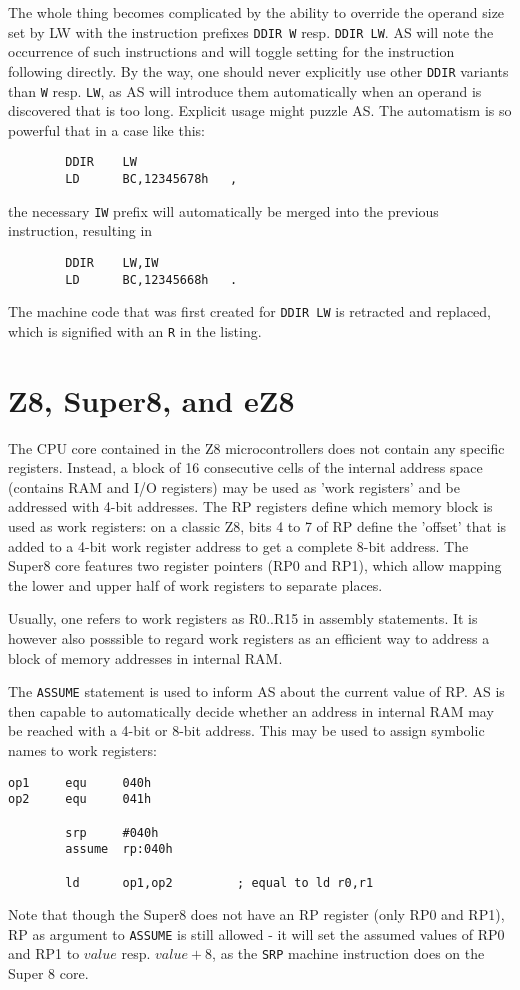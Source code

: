 \documentclass[12pt,twoside]{report}
\newcommand{\tty}[1]{{\tt #1}}
\begin{document}
The whole thing becomes complicated by the ability to override the operand
size set by LW with the instruction prefixes \tty{DDIR W} resp.
\tty{DDIR LW}.  AS will note the occurrence of such instructions and will
toggle setting for the instruction following directly.  By the way, one
should never explicitly use other \tty{DDIR} variants than \tty{W} resp.
\tty{LW}, as AS will introduce them automatically when an operand is
discovered that is too long.  Explicit usage might puzzle AS.  The
automatism is so powerful that in a case like this:
\begin{verbatim}
        DDIR    LW
        LD      BC,12345678h   ,
\end{verbatim}
the necessary \tty{IW} prefix will automatically be merged into the previous
instruction, resulting in
\begin{verbatim}
        DDIR    LW,IW
        LD      BC,12345668h   .
\end{verbatim}
The machine code that was first created for \tty{DDIR LW} is retracted and
replaced, which is signified with an \tty{R} in the listing.


\section{Z8, Super8, and eZ8}
\label{Z8Spec}

The CPU core contained in the Z8 microcontrollers does not
contain any specific registers.  Instead, a block of 16
consecutive cells of the internal address space (contains RAM and
I/O registers) may be used as 'work registers' and be addressed
with 4-bit addresses.  The RP registers define which memory block
is used as work registers: on a classic Z8, bits 4 to 7 of RP
define the 'offset' that is added to a 4-bit work register
address to get a complete 8-bit address.  The Super8 core
features two register pointers (RP0 and RP1), which allow mapping
the lower and upper half of work registers to separate places.

Usually, one refers to work registers as R0..R15 in assembly
statements.  It is however also posssible to regard work registers as
an efficient way to address a block of memory addresses in internal
RAM.

The \tty{ASSUME} statement is used to inform AS about the current
value of RP. AS is then capable to automatically decide whether an
address in internal RAM may be reached with a 4-bit or 8-bit address.
This may be used to assign symbolic names to work registers:
\begin{verbatim}
op1     equ     040h
op2     equ     041h

        srp     #040h
        assume  rp:040h

        ld      op1,op2         ; equal to ld r0,r1
\end{verbatim}
Note that though the Super8 does not have an RP register (only
RP0 and RP1), RP as argument to \tty{ASSUME} is still allowed -
it will set the assumed values of RP0 and RP1 to $value$ resp.
$value+8$, as the \tty{SRP} machine instruction does on the Super
8 core.
\end{document}
